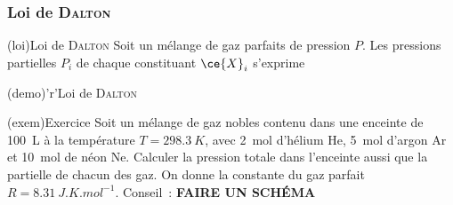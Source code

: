 \documentclass[../../main/main.tex]{subfiles}
\begin{document}
\subsubsection{Loi de \textsc{Dalton}}
\begin{tcbraster}[raster columns=2, raster equal height=rows]
	\begin{tcb}[label=loi:dalton](loi){Loi de \textsc{Dalton}}
		Soit un mélange de gaz parfaits de pression $P$. Les pressions
		partielles $P_i$ de chaque constituant $\ce{X}_i$ s'exprime
		\psw{
			\[\boxed{P_i = x_iP}\]
		}
		\vspace{-15pt}
	\end{tcb}
	\begin{tcb}[label=demo:dalton](demo)'r'{Loi de \textsc{Dalton}}
		\psw{
			\[
				P_i =\frac{n_{g,i}RT}{V} = \xunderbracket{\frac{n_{g,i}}{n_{g,\tot}}}_{x_i}
				\times \xunderbracket{\frac{n_{g,\tot}RT}{V}}_{P}
				\Lra
				\boxed{P_i = x_iP}
				\qed
			\]
		}
	\end{tcb}
\end{tcbraster}

\begin{tcb}[breakable](exem){Exercice}
	Soit un mélange de gaz nobles contenu dans une enceinte de \SI{100}{L} à la
	température $T = \SI{298.3}{K}$, avec \SI{2}{mol} d'hélium He, \SI{5}{mol}
	d'argon Ar et \SI{10}{mol} de néon Ne.
	\smallbreak
	Calculer la pression totale dans l'enceinte aussi que la partielle de chacun
	des gaz.
	\smallbreak
	On donne la constante du gaz parfait $R = \SI{8.31}{J.K.mol^{-1}}$.
	\smallbreak
	Conseil~: \textbf{FAIRE UN SCHÉMA}
	\tcblower
	\begin{isd}
		\tcblower
	\end{isd}
\end{tcb}
\end{document}
